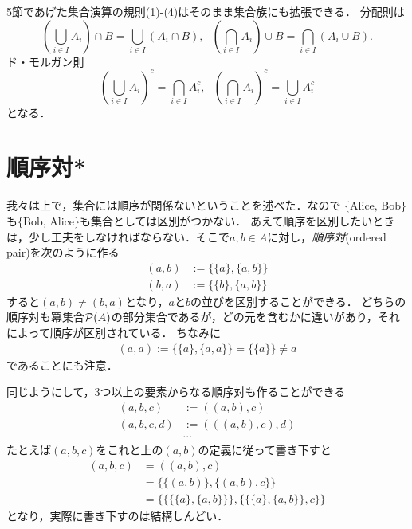 \documentclass[11pt,a4paper]{jsarticle}
\begin{document}
5節であげた集合演算の規則(1)-(4)はそのまま集合族にも拡張できる．
分配則は
\[
 \left( \bigcup_{i \in I} A_i \right) \cap B = \bigcup_{i \in I} \left( A_i  \cap B \right) , \ \ \ 
 \left( \bigcap_{i \in I} A_i \right) \cup B = \bigcap_{i \in I} \left( A_i  \cup B \right). 
\]
ド・モルガン則
\[
 \left( \bigcup_{i \in I} A_i \right)^c = \bigcap_{i \in I} A_i^c, \ \ \ 
 \left( \bigcap_{i \in I} A_i \right)^c = \bigcup_{i \in I} A_i^c
\]
となる．





\section{順序対*}
我々は上で，集合には順序が関係ないということを述べた．なので $\{\text{Alice, Bob}\}$も$\{\text{Bob, Alice}\}$も集合としては区別がつかない．
あえて順序を区別したいときは，少し工夫をしなければならない．そこで$a, b \in A$に対し，\emph{順序対}(ordered pair)を次のように作る
\begin{align*}
 (a, b) &:= \{ \{a\}, \{a, b\} \} \\
 (b, a) &:= \{ \{b\}, \{a, b\} \} 
\end{align*}
すると$(a,b) \neq (b,a)$となり，$a$と$b$の並びを区別することができる．
どちらの順序対も冪集合$\mathcal{P}(A)$の部分集合であるが，どの元を含むかに違いがあり，それによって順序が区別されている．
ちなみに
\begin{align*}
 (a, a) := \{ \{a\}, \{a, a\} \} = \{ \{a\} \} \neq a 
\end{align*}
であることにも注意．

同じようにして，3つ以上の要素からなる順序対も作ることができる
\begin{align*}
 (a, b, c) &:= ((a,b), c) \\
 (a, b, c, d) &:= (((a,b), c), d) \\
&\cdots
\end{align*}
たとえば$ (a, b, c)$をこれと上の$(a,b)$の定義に従って書き下すと
\begin{align*}
 (a, b, c)  &= ((a,b), c) \\
            &= \{ \{ (a,b) \}, \{ (a,b), c \} \} \\
            &= \{\{\{\{a\}, \{a,b\}\}\}, \{\{\{a\}, \{a,b\}\}, c\}\} 
\end{align*}
となり，実際に書き下すのは結構しんどい．
\end{document}
